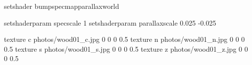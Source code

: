 setshader bumpspecmapparallaxworld

setshaderparam specscale 1
setshaderparam parallaxscale 0.025 -0.025

texture c photos/wood01_c.jpg 0 0 0 0.5
texture n photos/wood01_n.jpg 0 0 0 0.5
texture s photos/wood01_s.jpg 0 0 0 0.5
texture z photos/wood01_z.jpg 0 0 0 0.5
